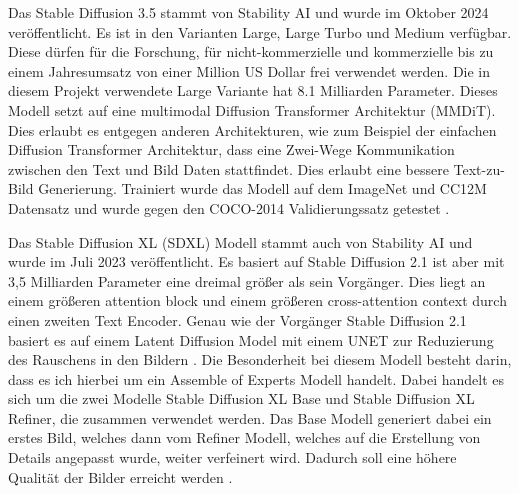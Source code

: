 Das Stable Diffusion 3.5 stammt von Stability AI und wurde im Oktober 2024 veröffentlicht. Es ist in den Varianten Large, Large Turbo und Medium verfügbar. Diese dürfen für die Forschung, für nicht-kommerzielle und kommerzielle bis zu einem Jahresumsatz von einer Million US Dollar frei verwendet werden.
Die in diesem Projekt verwendete Large Variante hat 8.1 Milliarden Parameter. Dieses Modell setzt auf eine multimodal Diffusion Transformer Architektur (MMDiT). Dies erlaubt es entgegen anderen Architekturen, wie zum Beispiel der einfachen Diffusion Transformer Architektur, dass eine Zwei-Wege Kommunikation zwischen den Text und Bild Daten stattfindet. Dies erlaubt eine bessere Text-zu-Bild Generierung. Trainiert wurde das Modell auf dem ImageNet und CC12M Datensatz und wurde gegen den COCO-2014 Validierungssatz getestet \cite[S.~4-5]{esser2024scalingrectifiedflowtransformers}.

Das Stable Diffusion XL (SDXL) Modell stammt auch von Stability AI und wurde im Juli 2023 veröffentlicht. Es basiert auf Stable Diffusion 2.1 ist aber mit 3,5 Milliarden Parameter eine dreimal größer als sein Vorgänger. Dies liegt an einem größeren attention block und einem größeren cross-attention context durch einen zweiten Text Encoder. Genau wie der Vorgänger Stable Diffusion 2.1 basiert es auf einem Latent Diffusion Model mit einem UNET zur Reduzierung des Rauschens in den Bildern \cite[Abstract]{podell2023sdxlimprovinglatentdiffusion}.
Die Besonderheit bei diesem Modell besteht darin, dass es ich hierbei um ein Assemble of Experts Modell handelt. Dabei handelt es sich um die zwei Modelle Stable Diffusion XL Base und Stable Diffusion XL Refiner, die zusammen verwendet werden. Das Base Modell generiert dabei ein erstes Bild, welches dann vom Refiner Modell, welches auf die Erstellung von Details angepasst wurde, weiter verfeinert wird. Dadurch soll eine höhere Qualität der Bilder erreicht werden \cite[S.~2]{podell2023sdxlimprovinglatentdiffusion}.


